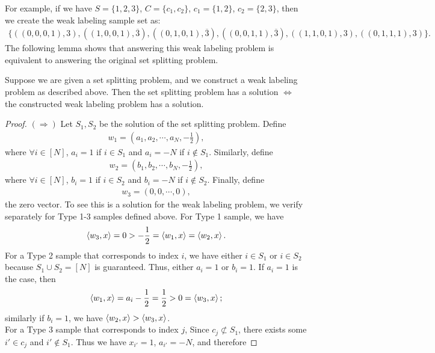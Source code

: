 For example, if we have $S=\{1,2,3\}$, $C=\{c_1, c_2\}$, $c_1 = \{1,2\}$, $c_2=\{2,3\}$, then we create the weak labeling sample set as: 
\begin{align*}
    \{((0,0,0,1),3), ((1,0,0,1),\overline{3}), ((0,1,0,1),\overline{3}), ((0,0,1,1),\overline{3}), ((1,1,0,1),3), ((0,1,1,1),3)\}.
\end{align*}
The following lemma shows that answering this weak labeling problem is equivalent to answering the original set splitting problem. 
\begin{lemma}
Suppose we are given a set splitting problem, and we construct a weak labeling problem as described above. Then the set splitting problem has a solution $\Longleftrightarrow$ the constructed weak labeling problem has a solution. 
\end{lemma}
\begin{proof}
 $(\Longrightarrow)$ Let $S_1, S_2$ be the solution of the set splitting problem. Define
 \begin{align*}
     w_1 = \left(a_1, a_2, \cdots, a_N, -\frac{1}{2}\right), 
 \end{align*}
 where $\forall i\in[N]$, $a_i=1$ if $i\in S_1$ and $a_i=-N$ if $i\notin S_1$. 
 Similarly, define
 \begin{align*}
     w_2 = \left(b_1, b_2, \cdots, b_N, -\frac{1}{2}\right), 
 \end{align*}
 where $\forall i\in[N]$, $b_i=1$ if $i\in S_2$ and $b_i=-N$ if $i\notin S_2$. 
 Finally, define
 \begin{align*}
     w_3 = (0,0,\cdots, 0), 
 \end{align*}
 the zero vector. To see this is a solution for the weak labeling problem, we verify separately for Type 1-3 samples defined above. For Type 1 sample, we have
 \begin{align*}
     \left\langle w_3, x \right\rangle = 0 > -\frac{1}{2} = \left\langle w_1, x \right\rangle=\left\langle w_2, x \right\rangle. 
 \end{align*}
 For a Type 2 sample that corresponds to index $i$, we have either $i\in S_1$ or $i\in S_2$ because $S_1\cup S_2 = [N]$ is guaranteed. Thus, either $a_i=1$ or $b_i=1$. If $a_i=1$ is the case, then
 \begin{align*}
     \left\langle w_1, x \right\rangle=a_i-\frac{1}{2}=\frac{1}{2} > 0 = \left\langle w_3, x \right\rangle; 
 \end{align*}
 similarly if $b_i=1$, we have $\left\langle w_2, x \right\rangle>\left\langle w_3, x \right\rangle$. \\
 For a Type 3 sample that corresponds to index $j$, Since $c_j \not\subset S_1$, there exists some $i'\in c_j$ and $i'\notin S_1$. Thus we have $x_{i'}=1$, $a_{i'}=-N$, and therefore

\end{proof}
